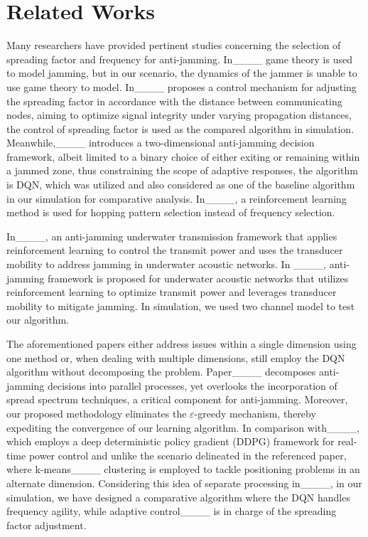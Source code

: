 \section{Related Works}
Many researchers have provided pertinent studies concerning the selection of spreading factor and frequency for anti-jamming. In____ game theory is used to model jamming, but in our scenario, the dynamics of the jammer is unable to use game theory to model. In____ proposes a control mechanism for adjusting the spreading factor in accordance with the distance between communicating nodes, aiming to optimize signal integrity under varying propagation distances, the control of spreading factor is used as the compared algorithm in simulation. \textcolor[rgb]{0000,0.00,0000}{Meanwhile,____ introduces a two-dimensional anti-jamming decision framework, albeit limited to a binary choice of either exiting or remaining within a jammed zone, thus constraining the scope of adaptive responses, the algorithm is DQN, which was utilized and also considered as one of the baseline algorithm in our simulation for comparative analysis. In____, a reinforcement learning method is used for hopping pattern selection instead of frequency selection.}

In____, an anti-jamming underwater transmission framework that applies reinforcement learning to control the transmit power and uses the transducer mobility to address jamming in underwater acoustic networks. In ____, anti-jamming framework is proposed for underwater acoustic networks that utilizes reinforcement learning to optimize transmit power and leverages transducer mobility to mitigate jamming. In simulation, we used two channel model to test our algorithm.

The aforementioned papers either address issues within a single dimension using one method or, when dealing with multiple dimensions, still employ the DQN algorithm without decomposing the problem. Paper____ decomposes anti-jamming decisions into parallel processes, yet overlooks the incorporation of spread spectrum techniques, a critical component for anti-jamming. Moreover, our proposed methodology eliminates the $\varepsilon$-greedy mechanism, thereby expediting the convergence of our learning algorithm. In comparison with____, which employs a deep deterministic policy gradient (DDPG) framework for real-time power control and unlike the scenario delineated in the referenced paper, where k-means____ clustering is employed to tackle positioning problems in an alternate dimension. Considering this idea of separate processing in____, in our simulation, we have designed a comparative algorithm where the DQN handles frequency agility, while adaptive control____ is in charge of the spreading factor adjustment.